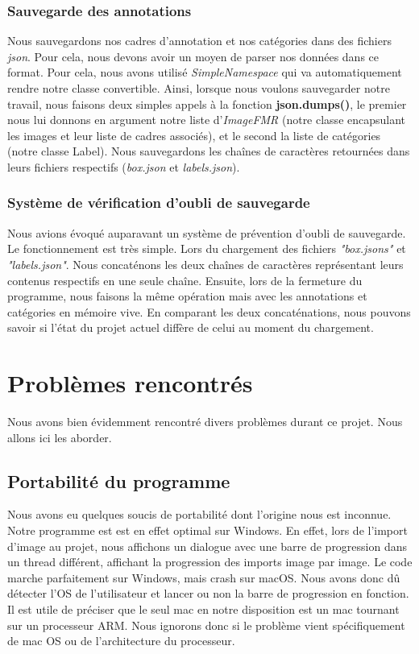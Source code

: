 \documentclass{rapport}
\begin{document}
            \subsubsection{Sauvegarde des annotations}
            Nous sauvegardons nos cadres d'annotation et nos catégories dans des fichiers \textit{json}. Pour cela, nous devons avoir un moyen de parser nos données dans ce format. Pour cela, nous avons utilisé \textit{SimpleNamespace} qui va automatiquement rendre notre classe convertible. Ainsi, lorsque nous voulons sauvegarder notre travail, nous faisons deux simples appels à la fonction \textbf{json.dumps()}, le premier nous lui donnons en argument notre liste d'\textit{ImageFMR} (notre classe encapsulant les images et leur liste de cadres associés), et le second la liste de catégories (notre classe Label). Nous sauvegardons les chaînes de caractères retournées dans leurs fichiers respectifs (\textit{box.json} et \textit{labels.json}).

            \subsubsection{Système de vérification d'oubli de sauvegarde}
            Nous avions évoqué auparavant un système de prévention d'oubli de sauvegarde.
            Le fonctionnement est très simple. Lors du chargement des fichiers \textit{"box.jsons"} et \textit{"labels.json"}. Nous concaténons les deux chaînes de caractères représentant leurs contenus respectifs en une seule chaîne.
            Ensuite, lors de la fermeture du programme, nous faisons la même opération mais avec les annotations et catégories en mémoire vive. En comparant les deux concaténations, nous pouvons savoir si l'état du projet actuel diffère de celui au moment du chargement.
            
    \section{Problèmes rencontrés}
    Nous avons bien évidemment rencontré divers problèmes durant ce projet. Nous allons ici les aborder.
    
        \subsection{Portabilité du programme}
        Nous avons eu quelques soucis de portabilité dont l'origine nous est inconnue. Notre programme est est en effet optimal sur Windows. En effet, lors de l'import d'image au projet, nous affichons un dialogue avec une barre de progression dans un thread différent, affichant la progression des imports image par image. Le code marche parfaitement sur Windows, mais crash sur macOS. Nous avons donc dû détecter l'OS de l'utilisateur et lancer ou non la barre de progression en fonction. Il est utile de préciser que le seul mac en notre disposition est un mac tournant sur un processeur ARM. Nous ignorons donc si le problème vient spécifiquement de mac OS ou de l'architecture du processeur.
\end{document}
